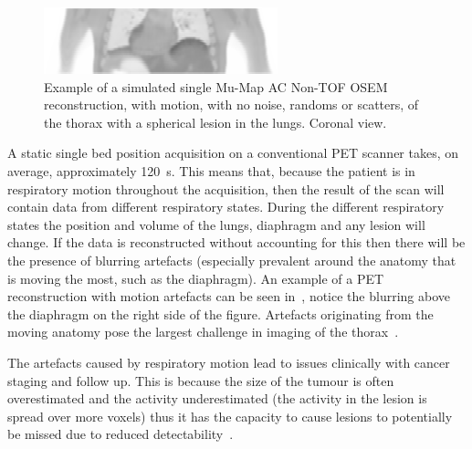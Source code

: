             \begin{figure}
                \centering
                
                \includegraphics[width=1.0\linewidth]{figures/background_single_mu-map_ac_example.png}
                
                \captionsetup{singlelinecheck=false, justification=raggedright}
                \caption{Example of a simulated single \gls{Mu-Map} \gls{AC} \gls{Non-TOF} \gls{OSEM} reconstruction, with motion, with no noise, randoms or scatters, of the thorax with a spherical lesion in the lungs. Coronal view.}
                \label{fig:respiratory_motion_artefacts_single_mu-map_ac}
            \end{figure}
            
            A static single bed position acquisition on a conventional \gls{PET} scanner takes, on average, approximately \SI{120}{\second}. This means that, because the patient is in respiratory motion throughout the acquisition, then the result of the scan will contain data from different respiratory states. During the different respiratory states the position and volume of the lungs, diaphragm and any lesion will change. If the data is reconstructed without accounting for this then there will be the presence of blurring artefacts (especially prevalent around the anatomy that is moving the most, such as the diaphragm). %
            An example of a \gls{PET} reconstruction with motion artefacts can be seen in~, notice the blurring above the diaphragm on the right side of the figure. Artefacts originating from the moving anatomy pose the largest challenge in imaging of the thorax~\parencite{LungMotionArtefactBib, PETCTArtifactBib}.
            
            The artefacts caused by respiratory motion lead to issues clinically with cancer staging and follow up. This is because the size of the tumour is often overestimated and the activity underestimated (the activity in the lesion is spread over more voxels) thus it has the capacity to cause lesions to potentially be missed due to reduced detectability~\parencite{LungMotionJudgmentErrorsBib}. %
            
